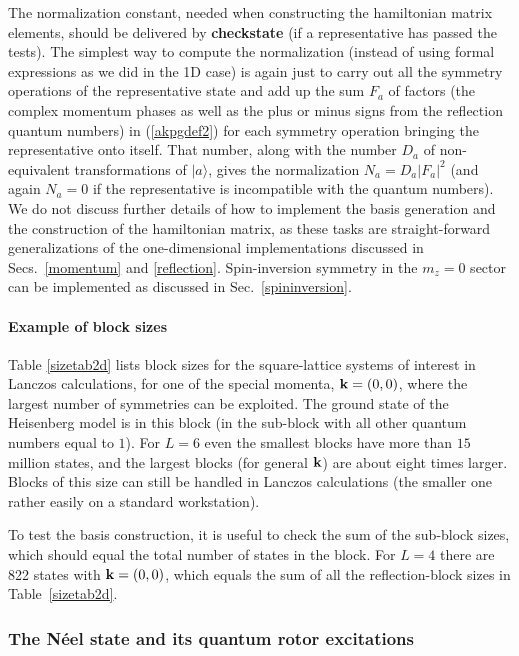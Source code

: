 \documentclass[draft,numberedheadings]{aipproc}
\begin{document}
The normalization constant, needed when constructing the hamiltonian matrix elements, should be delivered by {\bf checkstate} (if a 
representative has passed the tests). The simplest way to compute the normalization (instead of using formal expressions as we did in the 1D 
case) is again just to carry out all the symmetry operations of the representative state and add up the sum $F_a$ of factors (the complex momentum 
phases as well as the plus or minus signs from the reflection quantum numbers) in (\ref{akpgdef2}) for each symmetry operation bringing the representative 
onto itself. That number, along with the number $D_a$ of non-equivalent transformations of $|a\rangle$, gives the normalization $N_a=D_a|F_a|^2$
(and again $N_a=0$ if the representative is incompatible with the quantum numbers). We do not discuss further details of how to implement the 
basis generation and the construction of the hamiltonian matrix, as these tasks are straight-forward generalizations of the one-dimensional 
implementations discussed in Secs.~\ref{momentum} and \ref{reflection}. Spin-inversion symmetry in the $m_z=0$ sector can be implemented as 
discussed in Sec.~\ref{spininversion}.

\paragraph{Example of block sizes}

Table \ref{sizetab2d} lists block sizes for the square-lattice systems of interest in Lanczos calculations, for one of the special 
momenta, ${\bf k}=(0,0)$, where the largest number of symmetries can be exploited. The ground state of the Heisenberg model is in this block (in
the sub-block with all other quantum numbers equal to $1$). For $L=6$ even the smallest blocks have more than $15$ million states, and the largest 
blocks (for general ${\bf k}$) are about eight times larger. Blocks of this size can still be handled in Lanczos calculations (the smaller one 
rather easily on a standard workstation).

To test the basis construction, it is useful to check the sum of the sub-block sizes, which should equal the total number of states in the 
block. For $L=4$ there are 822 states with ${\bf k}=(0,0)$, which equals the sum of all the reflection-block sizes in Table~\ref{sizetab2d}.

\subsubsection{The N\'eel state and its quantum rotor excitations}
\label{lanc2d}
\end{document}
